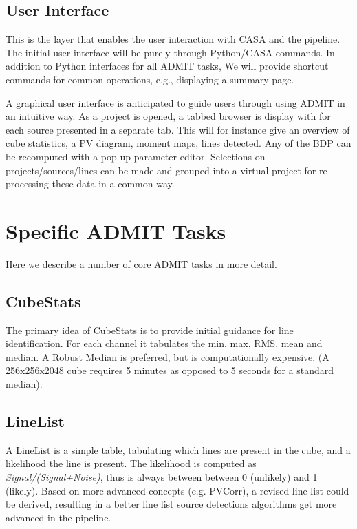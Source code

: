 \documentclass{article}
\begin{document}
\subsection{User Interface}

This is the layer that enables the user interaction with CASA and the pipeline. 
The initial user interface will be purely through Python/CASA commands.
In addition to Python interfaces for all ADMIT tasks, We will provide
shortcut commands for common operations, e.g., displaying a summary page.

A graphical user interface is anticipated to guide users through using
ADMIT in an intuitive way. As a project is opened, a tabbed browser is
display with for each source presented in a separate tab. This will for
instance give an overview of cube statistics, a PV diagram, moment maps,
lines detected.  Any of the BDP can be recomputed with a pop-up parameter
editor. Selections on projects/sources/lines can be made and grouped
into a virtual project for re-processing these data in a common way.

\section{Specific ADMIT Tasks}


Here we describe a number of core ADMIT tasks in more detail.

\subsection{CubeStats}

The primary idea of CubeStats is to provide initial guidance for line
identification. For each channel it tabulates the min, max, RMS, mean
and median.  A Robust Median is preferred, but is computationally 
expensive. (A 256x256x2048 cube requires 5 minutes as opposed to 5 seconds
for a standard median).

\subsection{LineList}

A LineList is a simple table, tabulating which lines are present in the
cube, and a likelihood the line is present. The likelihood is computed as
{\it Signal/(Signal+Noise)}, thus is always between between 0 (unlikely)
and 1 (likely).  Based on more advanced concepts (e.g. PVCorr), a revised
line list could be derived, resulting in a better line list source
detections algorithms get more advanced in the pipeline.
\end{document}
